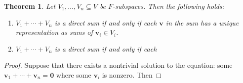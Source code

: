 \documentclass[11pt]{article}
\newtheorem{theorem}{Theorem}
\renewcommand{\vec}[1]{\mathbf{#1}}
\begin{document}
\begin{adjustwidth}{0.5cm}{}
  \begin{theorem}
    Let $V_{1}, \ldots, V_{n} \subseteq V$ be $F$-subspaces. Then the following holds:
    \begin{enumerate}
      \item $V_{1} + \cdots + V_{n}$ is a direct sum if and only if each $\vec{v}$ in the sum has a unique representation as sums of $\vec{v}_{i} \in V_{i}$.
      \item $V_{1} + \cdots + V_{n}$ is a direct sum if and only if each 
    \end{enumerate}
  \end{theorem}
  \begin{proof}
    Suppose that there exists a nontrivial solution to the equation: some $\vec{v}_{1} + \cdots + \vec{v}_{n} = \vec{0}$ where some $\vec{v}_{i}$ is nonzero. Then
  \end{proof}
\end{adjustwidth}


\end{document}
